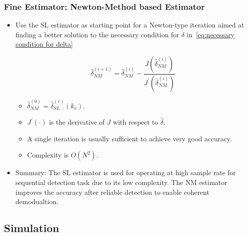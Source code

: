 \begin{frame}
  \frametitle{Fine Estimator: Newton-Method based Estimator}

    \begin{itemize}
    
      \item Use the SL estimator as starting point for a Newton-type iteration aimed at finding a better solution to the necessary condition for $\hat{\delta}$ in~\eqref{eq:necessary condition for delta}
      
      \begin{equation}
        \label{eq:iter_NM_est}
        \hat{\delta}_{NM}^{(i+1)}=\hat{\delta}_{NM}^{(i)}-
        \frac{J(\hat{\delta}_{NM}^{(i)})}{J^\prime(\hat{\delta}_{NM}^{(i)})}
      \end{equation}

      \begin{itemize}
        \item $\hat{\delta}_{NM}^{(0)}=\hat{\delta}^{(v)}_{SL}(k_v)$.
        \item $J^\prime(\cdot)$ is the derivative of $J$ with respect to $\hat{\delta}$.
        \item A single iteration is usually sufficient to achieve very good accuracy.
        \item Complexity is $O(N^2)$.
      \end{itemize}

      \item Summary: The SL estimator is used for operating at high sample rate for sequential detection task due to its low complexity.
      The NM estimator improves the accuracy after reliable detection to enable coherent demodualtion.
        

    \end{itemize}




\end{frame}

\subsection{Simulation}

